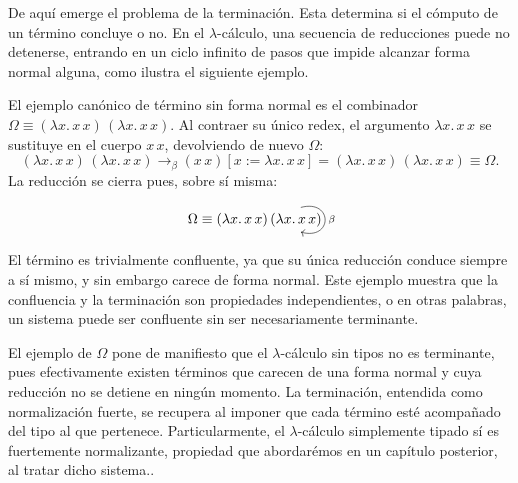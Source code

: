 De aquí emerge el problema de la terminación. Esta determina si el cómputo de un término concluye o no. En el $\lambda$-cálculo, una secuencia de reducciones puede no detenerse, entrando en un ciclo infinito de pasos que impide alcanzar forma normal alguna, como ilustra el siguiente ejemplo.

\begin{example}
  El ejemplo canónico de término sin forma normal es el combinador $\Omega \equiv
  (\lambda x.\, x\,x)\,(\lambda x.\, x\,x)$. Al contraer su único redex, el argumento
  $\lambda x.\, x\,x$ se sustituye en el cuerpo $x\,x$, devolviendo de nuevo $\Omega$:
  \[
  (\lambda x.\, x\,x)\,(\lambda x.\, x\,x) \to_\beta
  (x\,x)[x := \lambda x.\, x\,x] = (\lambda x.\, x\,x)\,(\lambda x.\, x\,x) \equiv \Omega.
  \]
  La reducción se cierra pues, sobre sí misma:
  \[
  \begin{tikzcd}[column sep=3em]
  \Omega \equiv (\lambda x.\, x\,x)\,(\lambda x.\, x\,x) \arrow[loop right, "\beta", distance=2.4em]
  \end{tikzcd}
  \]
  El término es trivialmente confluente, ya que su única reducción conduce siempre a sí mismo, y sin embargo carece de forma normal. Este ejemplo muestra que la confluencia y la terminación son propiedades independientes, o en otras palabras, un sistema puede ser confluente sin ser necesariamente terminante.
\end{example}

El ejemplo de $\Omega$ pone de manifiesto que el $\lambda$-cálculo sin tipos no es terminante, pues efectivamente existen términos que carecen de una forma normal y cuya reducción no se detiene en ningún momento. La terminación, entendida como normalización fuerte, se recupera al imponer que cada término esté acompañado del tipo al que pertenece. Particularmente, el $\lambda$-cálculo simplemente tipado sí es fuertemente normalizante, propiedad que abordarémos en un capítulo posterior, al tratar dicho sistema.\citep{geuvers2014, pierce2002}.

